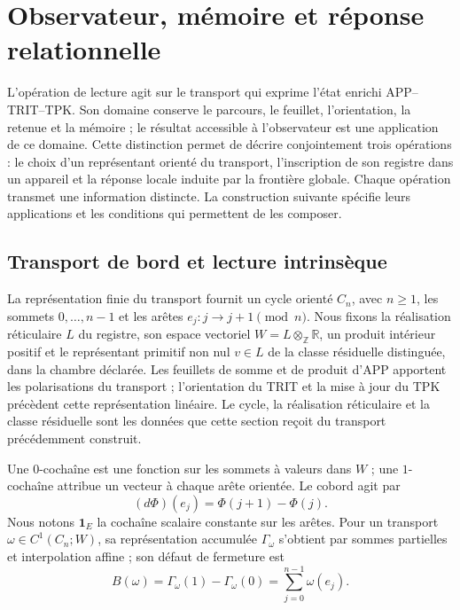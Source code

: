 
\section{Observateur, mémoire et réponse relationnelle}
\label{vii:sec:observador-respuesta}

L'opération de lecture agit sur le transport qui exprime l'état enrichi APP--TRIT--TPK. Son domaine conserve le parcours, le feuillet, l'orientation, la retenue et la mémoire ; le résultat accessible à l'observateur est une application de ce domaine. Cette distinction permet de décrire conjointement trois opérations : le choix d'un représentant orienté du transport, l'inscription de son registre dans un appareil et la réponse locale induite par la frontière globale. Chaque opération transmet une information distincte. La construction suivante spécifie leurs applications et les conditions qui permettent de les composer.

\subsection{Transport de bord et lecture intrinsèque}
\label{vii:sec:observador-ciclo}

La représentation finie du transport fournit un cycle orienté \(C_n\), avec \(n\geq1\), les sommets \(0,\ldots,n-1\) et les arêtes \(e_j:j\longrightarrow j+1\pmod n\). Nous fixons la réalisation réticulaire \(L\) du registre, son espace vectoriel \(W=L\otimes_{\mathbb Z}\mathbb R\), un produit intérieur positif et le représentant primitif non nul \(v\in L\) de la classe résiduelle distinguée, dans la chambre déclarée. Les feuillets de somme et de produit d'APP apportent les polarisations du transport ; l'orientation du TRIT et la mise à jour du TPK précèdent cette représentation linéaire. Le cycle, la réalisation réticulaire et la classe résiduelle sont les données que cette section reçoit du transport précédemment construit.

Une \(0\)-cochaîne est une fonction sur les sommets à valeurs dans \(W\) ; une \(1\)-cochaîne attribue un vecteur à chaque arête orientée. Le cobord agit par
\[
 (d\Phi)(e_j)=\Phi(j+1)-\Phi(j).
\]
Nous notons \(\mathbf1_E\) la cochaîne scalaire constante sur les arêtes. Pour un transport \(\omega\in C^1(C_n;W)\), sa représentation accumulée \(\Gamma_\omega\) s'obtient par sommes partielles et interpolation affine ; son défaut de fermeture est
\begin{equation}
 B(\omega)=\Gamma_\omega(1)-\Gamma_\omega(0)
 =\sum_{j=0}^{n-1}\omega(e_j).
 \label{vii:eq:observador-defecto}
\end{equation}

